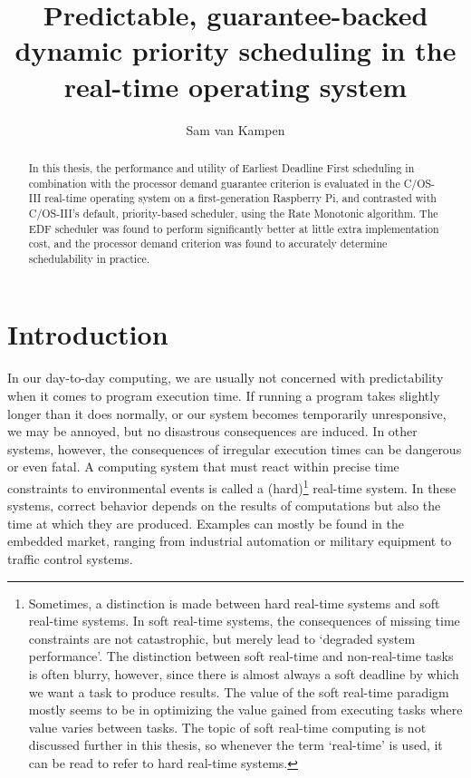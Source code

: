 \documentclass[twoside]{uva-inf-bachelor-thesis}
\title{Predictable, guarantee-backed\\dynamic priority scheduling in the \ucosiii real-time operating system}
\author{Sam van Kampen}
\newcommand{\ucosiii}{\textmu C/OS-III\xspace}
\begin{document}
\maketitle

\begin{abstract}
    In this thesis, the performance and utility of Earliest Deadline First scheduling in combination with the processor demand guarantee criterion is evaluated in the \ucosiii real-time operating system on a first-generation Raspberry Pi, and contrasted with \ucosiii's default, priority-based scheduler, using the Rate Monotonic algorithm. The EDF scheduler was found to perform significantly better at little extra implementation cost, and the processor demand criterion was found to accurately determine schedulability in practice.
\end{abstract}


\tableofcontents

%
%
%
%

\chapter{Introduction}
In our day-to-day computing, we are usually not concerned with predictability when it comes to program execution time. If running a program takes slightly longer than it does normally, or our system becomes temporarily unresponsive, we may be annoyed, but no disastrous consequences are induced. In other systems, however, the consequences of irregular execution times can be dangerous or even fatal. A computing system that must react within precise time constraints to environmental events is called a (hard)\footnote{Sometimes, a distinction is made between hard real-time systems and soft real-time systems. In soft real-time systems, the consequences of missing time constraints are not catastrophic, but merely lead to `degraded system performance'. The distinction between soft real-time and non-real-time tasks is often blurry, however, since there is almost always a soft deadline by which we want a task to produce results. The value of the soft real-time paradigm mostly seems to be in optimizing the value gained from executing tasks where value varies between tasks. The topic of soft real-time computing is not discussed further in this thesis, so whenever the term `real-time' is used, it can be read to refer to hard real-time systems.} real-time system\cite{buttazzo2011hard}. In these systems, correct behavior depends on the results of computations but also the time at which they are produced. Examples can mostly be found in the embedded market, ranging from industrial automation or military equipment to traffic control systems.
\end{document}
